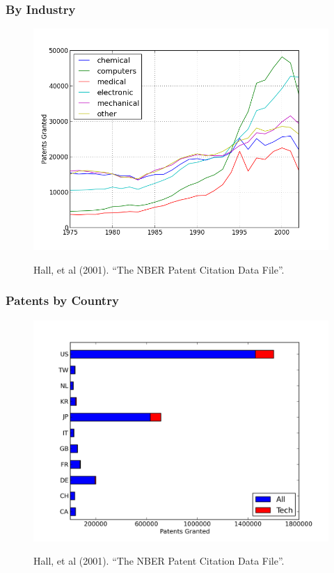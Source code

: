 \documentclass{beamer}
\begin{document}
\begin{frame}[t]\frametitle{By Industry} 
\fontsize{6pt}{7.2}\selectfont
\!\!\!\!\!\!\!\!\!\!\!\!\!
\begin{figure}[T]
  \begin{center}
    \includegraphics[scale=.5]{by_cat_year.png}
    \label{fig:by_cat_year}
  \end{center}
  \!\!\!\!\!
  Hall, et al (2001). ``The NBER Patent Citation Data File''.

\end{figure}
\end{frame}

\begin{frame}[t]\frametitle{Patents by Country} 
\fontsize{6pt}{7.2}\selectfont
\!\!\!\!\!\!\!\!\!\!\!\!\!
\begin{figure}[hb]
  \begin{center}
    \includegraphics[scale=.5]{by_country.png}
    \label{fig:by_country}
  \end{center}
  \!\!\!\!\!
  Hall, et al (2001). ``The NBER Patent Citation Data File''.  
\end{figure}
\end{frame}
\end{document}
